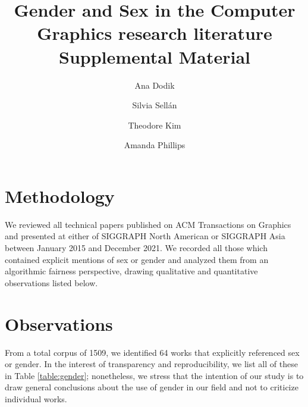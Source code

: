 \documentclass[nonacm,sigconf,review,balance=false]{acmart}
\begin{document}
\title{Gender and Sex in the Computer Graphics research literature \\
\Large{Supplemental Material}}

\author{Ana Dodik}

\author{Silvia Sellán}\authornotemark[1]


\author{Theodore Kim}

\author{Amanda Phillips}



\maketitle

\section{Methodology}

We reviewed all technical papers published on ACM Transactions on Graphics and
presented at either of SIGGRAPH North American or SIGGRAPH Asia between
January 2015 and December 2021. We recorded all those which contained
explicit mentions of sex or gender and analyzed them from an algorithmic fairness perspective, drawing qualitative and quantitative observations listed below.

\section{Observations}

From a total corpus of 1509, we identified 64 works that explicitly referenced sex or gender. In the interest of transparency and reproducibility, we list all of these in Table \ref{table:gender}; nonetheless, we stress that the intention of our study is to draw general conclusions about the use of gender in our field and not to criticize individual works.
\end{document}
